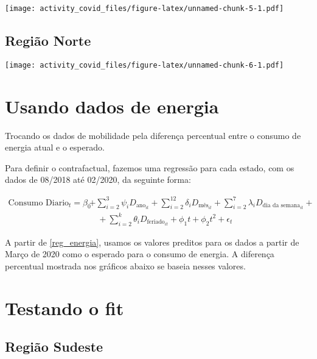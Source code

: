 \documentclass[
]{article}
\begin{document}
\texttt{[image: activity\_covid\_files/figure-latex/unnamed-chunk-5-1.pdf]}

\pagebreak

\hypertarget{regiuxe3o-norte}{%
\subsection{Região Norte}\label{regiuxe3o-norte}}

\texttt{[image: activity\_covid\_files/figure-latex/unnamed-chunk-6-1.pdf]}

\pagebreak

\hypertarget{usando-dados-de-energia}{%
\section{Usando dados de energia}\label{usando-dados-de-energia}}

Trocando os dados de mobilidade pela diferença percentual entre o
consumo de energia atual e o esperado.

Para definir o contrafactual, fazemos uma regressão para cada estado,
com os dados de 08/2018 até 02/2020, da seguinte forma:

\begin{equation}
\begin{split} \label{reg_energia}
\text{Consumo Diario}_{t} = \beta_0 & + \sum_{i=2}^{3} \psi_i D_{\text{ano}_{it}}+ \sum_{i=2}^{12} \delta_i D_{\text{mês}_{it}} + \sum_{i=2}^{7} \lambda_i D_{\text{dia da semana}_{it}} + \\
&\quad + \sum_{i=2}^{k} \theta_i D_{\text{feriado}_{it}} + \phi_1t + \phi_2t^2 + \epsilon_t
\end{split}
\end{equation}

A partir de \ref{reg_energia}, usamos os valores preditos para os dados
a partir de Março de 2020 como o esperado para o consumo de energia. A
diferença percentual mostrada nos gráficos abaixo se baseia nesses
valores.

\hypertarget{testando-o-fit}{%
\section{Testando o fit}\label{testando-o-fit}}

\hypertarget{regiuxe3o-sudeste-1}{%
\subsection{Região Sudeste}\label{regiuxe3o-sudeste-1}}
\end{document}
